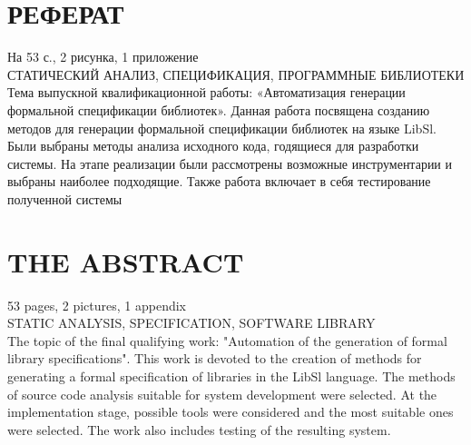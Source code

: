 \chapter*{РЕФЕРАТ}
\thispagestyle{empty}

На 53 с., 2 рисунка, 1 приложение \\

СТАТИЧЕСКИЙ АНАЛИЗ, СПЕЦИФИКАЦИЯ, ПРОГРАММНЫЕ БИБЛИОТЕКИ \\
Тема выпускной квалификационной работы: «Автоматизация генерации формальной спецификации библиотек».
Данная работа посвящена созданию методов для генерации формальной спецификации библиотек на языке LibSl.
Были выбраны методы анализа исходного кода, годящиеся для разработки системы.
На этапе реализации были рассмотрены возможные инструментарии и выбраны наиболее подходящие.
Также работа включает в себя тестирование полученной системы

\newline \newpage

\chapter*{THE ABSTRACT}
\thispagestyle{empty}

53 pages, 2 pictures, 1 appendix \\

STATIC ANALYSIS, SPECIFICATION, SOFTWARE LIBRARY \\

The topic of the final qualifying work: "Automation of the generation of formal library specifications".
This work is devoted to the creation of methods for generating a formal specification of libraries in the LibSl language.
The methods of source code analysis suitable for system development were selected.
At the implementation stage, possible tools were considered and the most suitable ones were selected.
The work also includes testing of the resulting system.